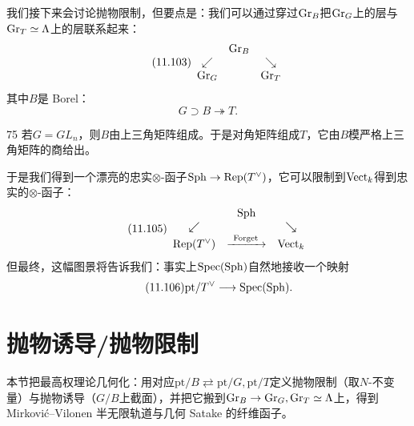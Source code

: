 我们接下来会讨论抛物限制，但要点是：我们可以通过穿过$\mathrm{Gr}_B$把$\mathrm{Gr}_G$上的层与$\mathrm{Gr}_T\simeq\Lambda$上的层联系起来：
\begin{equation}\tag{11.103}
\begin{array}{ccc}
 & \mathrm{Gr}_B & \\
 \swarrow & & \searrow\\
 \mathrm{Gr}_G & & \mathrm{Gr}_T
\end{array}
\end{equation}
其中$B$是 Borel：
\begin{equation}\tag{11.104}
G\supset B\twoheadrightarrow T.
\end{equation}
\begin{srcex}{75}
若$G=GL_n$，则$B$由上三角矩阵组成。于是对角矩阵组成$T$，它由$B$模严格上三角矩阵的商给出。
\end{srcex}
于是我们得到一个漂亮的忠实$\otimes$-函子$\mathrm{Sph}\to\mathrm{Rep}(T^{\vee})$，它可以限制到$\mathrm{Vect}_k$得到忠实的$\otimes$-函子：
\begin{equation}\tag{11.105}
\begin{array}{ccc}
 & \mathrm{Sph} & \\
 \swarrow & & \searrow\\
\mathrm{Rep}(T^{\vee}) & \xrightarrow{\ \operatorname{Forget}\ } & \mathrm{Vect}_k
\end{array}
\end{equation}
但最终，这幅图景将告诉我们：事实上$\mathrm{Spec}(\mathrm{Sph})$自然地接收一个映射
\begin{equation}\tag{11.106}
\mathrm{pt}/T^{\vee}\longrightarrow\mathrm{Spec}(\mathrm{Sph}).
\end{equation}


\section{抛物诱导/抛物限制}\label{sec:11-6}

\begin{sectionkey}
本节把最高权理论几何化：用对应$\mathrm{pt}/B\rightleftarrows\mathrm{pt}/G,\mathrm{pt}/T$定义抛物限制（取$N$-不变量）与抛物诱导（$G/B$上截面），并把它搬到$\mathrm{Gr}_B\to\mathrm{Gr}_G,\mathrm{Gr}_T\simeq\Lambda$上，得到 Mirkovi\'c–Vilonen 半无限轨道与几何 Satake 的纤维函子。
\end{sectionkey}

